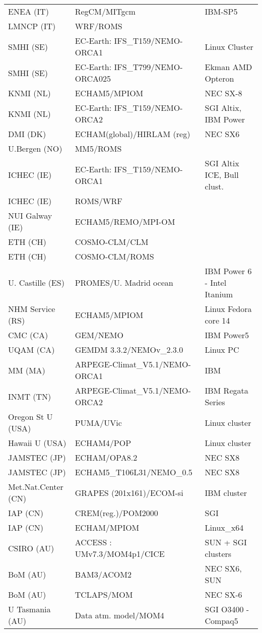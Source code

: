 \begin{center}
\begin{longtable}{|l|l|l|}
ENEA (IT) &	RegCM/MITgcm	 &				IBM-SP5 \\
LMNCP (IT) &	WRF/ROMS & \\
SMHI (SE) &	EC-Earth: IFS\_T159/NEMO-ORCA1 &			Linux Cluster \\
SMHI (SE) &	EC-Earth: IFS\_T799/NEMO-ORCA025  &			Ekman AMD Opteron \\
KNMI (NL) &	ECHAM5/MPIOM	 &				NEC SX-8 \\
KNMI (NL) &	EC-Earth: IFS\_T159/NEMO-ORCA2 &		SGI Altix, IBM Power \\
DMI (DK) &	         ECHAM(global)/HIRLAM (reg) &			NEC SX6 \\
U.Bergen (NO) &	MM5/ROMS & \\
ICHEC (IE) &	EC-Earth: IFS\_T159/NEMO-ORCA1 & SGI Altix ICE, Bull clust.\\
ICHEC (IE) &	ROMS/WRF & \\
NUI Galway (IE) &	ECHAM5/REMO/MPI-OM & \\				
ETH (CH) & COSMO-CLM/CLM & \\
ETH (CH) & COSMO-CLM/ROMS & \\
U. Castille (ES) &	PROMES/U. Madrid ocean &		IBM Power 6 - Intel Itanium \\
NHM Service (RS) & ECHAM5/MPIOM &   Linux Fedora core 14 \\
CMC (CA) &  GEM/NEMO  &				IBM Power5 \\		
UQAM (CA) & 	GEMDM 3.3.2/NEMOv\_2.3.0  & Linux PC \\
MM (MA) &	ARPEGE-Climat\_V5.1/NEMO-ORCA1 &	IBM \\
INMT (TN) &	ARPEGE-Climat\_V5.1/NEMO-ORCA2 &	IBM Regata Series \\Oregon St U (USA) & 	PUMA/UVic	 &	 Linux cluster \\
Hawaii U (USA)	 & ECHAM4/POP &					Linux cluster \\		
JAMSTEC (JP) & ECHAM/OPA8.2 &					NEC SX8 \\
JAMSTEC (JP) & ECHAM5\_T106L31/NEMO\_0.5 &			NEC SX8 \\
Met.Nat.Center (CN) & GRAPES (201x161)/ECOM-si  &	IBM cluster \\
IAP (CN) &  CREM(reg.)/POM2000  &		SGI \\
IAP (CN) &  ECHAM/MPIOM & 				Linux\_x64 \\
CSIRO (AU)  &    ACCESS : UMv7.3/MOM4p1/CICE &	SUN + SGI clusters \\
BoM (AU)    &   BAM3/ACOM2 &					NEC SX6, SUN \\
BoM (AU)    &   TCLAPS/MOM  &	NEC SX-6 \\
U Tasmania (AU) &  Data atm. model/MOM4 &		        SGI O3400 - Compaq5 \\
\end{longtable}



\end{center}
